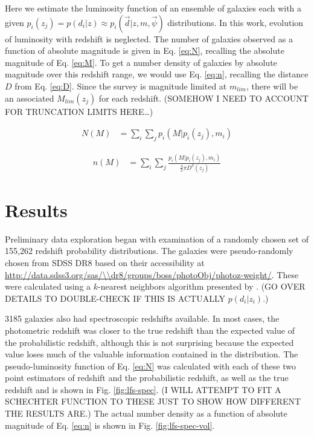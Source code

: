 \documentclass[12pt, onecolumn]{emulateapj}
\begin{document}
Here we estimate the luminosity function of an ensemble of galaxies each with a given $p_{i}(z_{j})=p(d_{i}|z)\approx p_{i}(\vec{d}|z,m,\vec{\psi})$ distributions.  In this work, evolution of luminosity with redshift is neglected.  The number of galaxies observed as a function of absolute magnitude is given in Eq. \ref{eq:N}, recalling the absolute magnitude of Eq. \ref{eq:M}.  To get a number density of galaxies by absolute magnitude over this redshift range, we would use Eq. \ref{eq:n}, recalling the distance $D$ from Eq. \ref{eq:D}.  Since the survey is magnitude limited at $m_{lim}$, there will be an associated $M_{lim}(z_{j})$ for each redshift.  (SOMEHOW I NEED TO ACCOUNT FOR TRUNCATION LIMITS HERE\dots)

\begin{eqnarray}
\label{eq:N}
N(M) &= \sum_{i}\sum_{j}p_{i}(M|p_{i}(z_{j}),m_{i})
\end{eqnarray}

\begin{eqnarray}
\label{eq:n}
n(M) &= \sum_{i}\sum_{j}\frac{p_{i}(M|p_{i}(z_{j}),m_{i})}{\frac{4}{3}\pi D^{3}(z_{j})}
\end{eqnarray}

\section{Results}

Preliminary data exploration began with examination of a randomly chosen set of 155,262 redshift probability distributions.  The galaxies were pseudo-randomly chosen from SDSS DR8 based on their accessibility at \url{http://data.sdss3.org/sas/\\dr8/groups/boss/photoObj/photoz-weight/}.  These were calculated using a $k$-nearest neighbors algorithm presented by \citet{she11}.  (GO OVER DETAILS TO DOUBLE-CHECK IF THIS IS ACTUALLY $p(d_{i}|z_{i})$.)  

3185 galaxies also had spectroscopic redshifts available.  In most cases, the photometric redshift was closer to the true redshift than the expected value of the probabilistic redshift, although this is not surprising because the expected value loses much of the valuable information contained in the distribution.  The pseudo-luminosity function of Eq. \ref{eq:N} was calculated with each of these two point estimators of redshift and the probabilistic redshift, as well as the true redshift and is shown in Fig. \ref{fig:lfs-spec}.  (I WILL ATTEMPT TO FIT A SCHECHTER FUNCTION TO THESE JUST TO SHOW HOW DIFFERENT THE RESULTS ARE.)  The actual number density as a function of absolute magnitude of Eq. \ref{eq:n} is shown in Fig. \ref{fig:lfs-spec-vol}.
\end{document}
